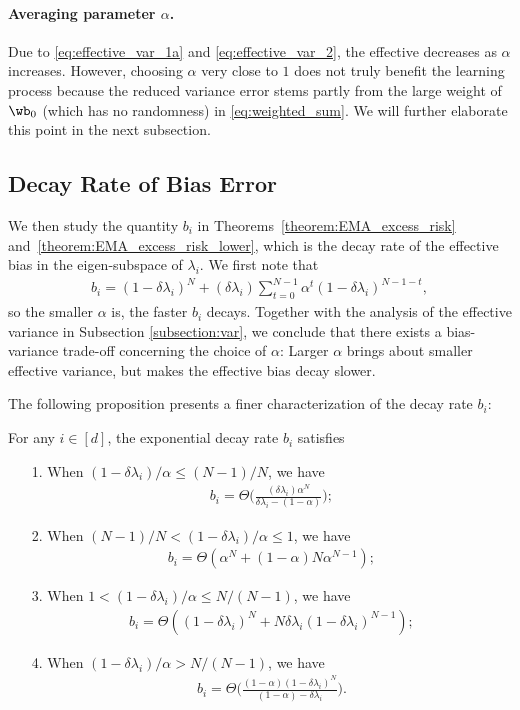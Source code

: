 \documentclass[11pt]{article}
\begin{document}
\paragraph{Averaging parameter $\alpha$.}
Due to \eqref{eq:effective_var_1a} and \eqref{eq:effective_var_2}, the effective decreases as $\alpha$ increases. However, choosing $\alpha$ very close to $1$ does not truly benefit the learning process because the reduced variance error stems partly from the large weight of $\wb_0$ (which has no randomness) in \eqref{eq:weighted_sum}. We will further elaborate this point in the next subsection.

\subsection{Decay Rate of Bias Error}\label{subsection:bi}
We then study the quantity $b_i$ in Theorems~\ref{theorem:EMA_excess_risk} and~\ref{theorem:EMA_excess_risk_lower}, which is the decay rate of the effective bias in the eigen-subspace of $\lambda_i$. We first note that
\begin{align*}
b_i=(1-\delta\lambda_i)^N+(\delta\lambda_i)\sum_{t=0}^{N-1}\alpha^t(1-\delta\lambda_i)^{N-1-t},
\end{align*}
so the smaller $\alpha$ is, the faster $b_i$ decays. Together with the analysis of the effective variance in Subsection \ref{subsection:var}, we conclude that there exists a bias-variance trade-off concerning the choice of $\alpha$: Larger $\alpha$ brings about smaller effective variance, but makes the effective bias decay slower.

The following proposition presents a finer characterization of the decay rate $b_i$:
\begin{proposition}\label{prop:exponential}
For any $i\in[d]$, the exponential decay rate $b_i$ satisfies
\begin{itemize}[leftmargin=*]
\item[1.] When $(1-\delta\lambda_i)/\alpha\le(N-1)/N$, we have
\begin{align*}
b_i=\Theta\bigg(\frac{(\delta\lambda_i)\alpha^N}{\delta\lambda_i-(1-\alpha)}\bigg);
\end{align*}
\item[2.] When $(N-1)/N<(1-\delta\lambda_i)/\alpha\le1$, we have
\begin{align*}
b_i=\Theta(\alpha^N+(1-\alpha)N\alpha^{N-1});
\end{align*}
\item[3.] When $1<(1-\delta\lambda_i)/\alpha\le N/(N-1)$, we have
\begin{align*}
b_i=\Theta((1-\delta\lambda_i)^N+N\delta\lambda_i(1-\delta\lambda_i)^{N-1});
\end{align*}
\item[4.] When $(1-\delta\lambda_i)/\alpha>N/(N-1)$, we have
\begin{align*}
b_i=\Theta\bigg(\frac{(1-\alpha)(1-\delta\lambda_i)^N}{(1-\alpha)-\delta\lambda_i}\bigg).
\end{align*}
\end{itemize}
\end{proposition}
\end{document}
